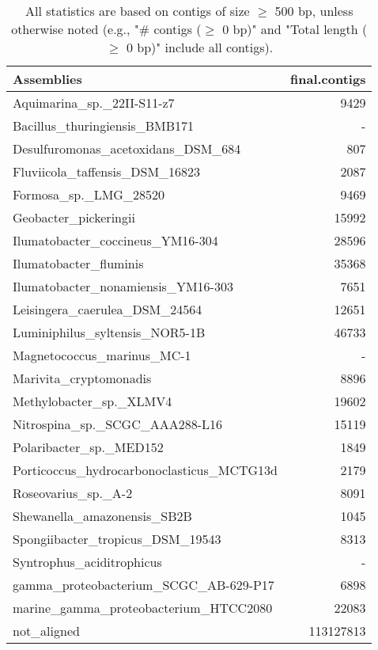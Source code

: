 \documentclass[12pt,a4paper]{article}
\begin{document}
\begin{table}[ht]
\begin{center}
\caption{All statistics are based on contigs of size $\geq$ 500 bp, unless otherwise noted (e.g., "\# contigs ($\geq$ 0 bp)" and "Total length ($\geq$ 0 bp)" include all contigs).}
\begin{tabular}{|l*{1}{|r}|}
\hline
Assemblies & final.contigs \\ \hline
Aquimarina\_sp.\_22II-S11-z7 & 9429 \\ \hline
Bacillus\_thuringiensis\_BMB171 & - \\ \hline
Desulfuromonas\_acetoxidans\_DSM\_684 & 807 \\ \hline
Fluviicola\_taffensis\_DSM\_16823 & 2087 \\ \hline
Formosa\_sp.\_LMG\_28520 & 9469 \\ \hline
Geobacter\_pickeringii & 15992 \\ \hline
Ilumatobacter\_coccineus\_YM16-304 & 28596 \\ \hline
Ilumatobacter\_fluminis & 35368 \\ \hline
Ilumatobacter\_nonamiensis\_YM16-303 & 7651 \\ \hline
Leisingera\_caerulea\_DSM\_24564 & 12651 \\ \hline
Luminiphilus\_syltensis\_NOR5-1B & 46733 \\ \hline
Magnetococcus\_marinus\_MC-1 & - \\ \hline
Marivita\_cryptomonadis & 8896 \\ \hline
Methylobacter\_sp.\_XLMV4 & 19602 \\ \hline
Nitrospina\_sp.\_SCGC\_AAA288-L16 & 15119 \\ \hline
Polaribacter\_sp.\_MED152 & 1849 \\ \hline
Porticoccus\_hydrocarbonoclasticus\_MCTG13d & 2179 \\ \hline
Roseovarius\_sp.\_A-2 & 8091 \\ \hline
Shewanella\_amazonensis\_SB2B & 1045 \\ \hline
Spongiibacter\_tropicus\_DSM\_19543 & 8313 \\ \hline
Syntrophus\_aciditrophicus & - \\ \hline
gamma\_proteobacterium\_SCGC\_AB-629-P17 & 6898 \\ \hline
marine\_gamma\_proteobacterium\_HTCC2080 & 22083 \\ \hline
not\_aligned & 113127813 \\ \hline
\end{tabular}
\end{center}
\end{table}
\end{document}
